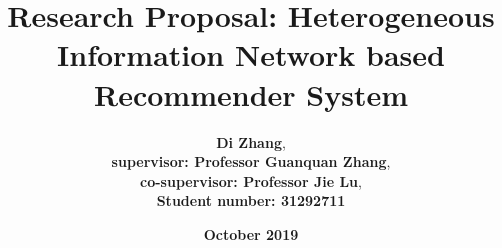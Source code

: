 \documentclass[12pt,a4 paper,title page]{article}
\title{Research Proposal: Heterogeneous Information Network based Recommender System}
\author{\large\textbf{Di Zhang}, \\
\textbf{supervisor: Professor Guanquan Zhang}, \\
\textbf{co-supervisor: Professor Jie Lu}, \\
\textbf{Student number: 31292711}}
\date{\Large{\textbf{October 2019}}}
\theoremstyle{definition}
\begin{document}
\sloppy
\maketitle
\hfill
\hfill













\clearpage

\end{document}
